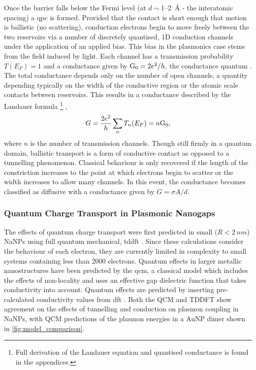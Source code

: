 \documentclass{article}
\begin{document}
Once the barrier falls below the Fermi level (at $d\sim$1--\SI{2}{\angstrom} - the interatomic spacing) a \gls{qpc} is formed. Provided that the contact is short enough that motion is ballistic (no scattering), conduction electrons begin to move freely between the two reservoirs via a number of discretely quantised, 1D conduction channels under the application of an applied bias. This bias in the plasmonics case stems from the field induced by light. Each channel has a transmission probability $T(E_F)=1$ and a conductance given by $\mathrm{G_{0}} = 2e^2/h$, the conductance quantum \cite{landauer1957spatial}. The total conductance depends only on the number of open channels, a quantity depending typically on the width of the conductive region or the atomic scale contacts between reservoirs. This results in a conductance described by the Landauer formula%
\footnote{Full derivation of the Landauer equation and quantised conductance is found in the appendices.} \cite{landauer1957spatial},
\begin{equation}
G = \frac{2e^2}{h}\sum_n T_n(E_F) = n\mathrm{G_{0}}, \label{eq:landauer}
\end{equation}
where $n$ is the number of transmission channels. Though still firmly in a quantum domain, ballistic transport is a form of conductive contact as opposed to a tunnelling phenomenon. Classical behaviour is only recovered if the length of the constriction increases to the point at which electrons begin to scatter or the width increases to allow many channels. In this event, the conductance becomes classified as diffusive with a conductance given by $G=\sigma A/d$.

\subsubsection{Quantum Charge Transport in Plasmonic Nanogaps}

The effects of quantum charge transport were first predicted in small ($R<\SI{2}{nm}$) NaNPs using full quantum mechanical, \gls{tddft} \cite{zuloaga2009}. Since these calculations consider the behaviour of each electron, they are currently limited in complexity to small systems containing less than 2000 electrons. Quantum effects in larger metallic nanostructures have been predicted by the \gls{qcm}, a classical model which includes the effects of non-locality and uses an effective gap dielectric function that takes conductivity into account. Quantum effects are predicted by inserting pre-calculated conductivity values from \gls{dft} \cite{esteban2012}. Both the QCM and TDDFT show agreement on the effects of tunnelling and conduction on plasmon coupling in NaNPs, with QCM predictions of the plasmon energies in a AuNP dimer shown in \autoref{fig:model_comparison}.
\end{document}
